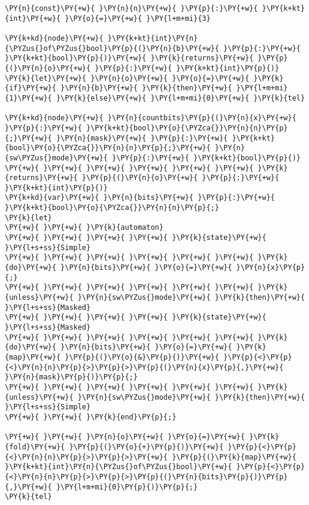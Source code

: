 \begin{Verbatim}[commandchars=\\\{\}]
\PY{n}{const}\PY{+w}{ }\PY{n}{n}\PY{+w}{ }\PY{p}{:}\PY{+w}{ }\PY{k+kt}{int}\PY{+w}{ }\PY{o}{=}\PY{+w}{ }\PY{l+m+mi}{3}

\PY{k+kd}{node}\PY{+w}{ }\PY{k+kt}{int}\PY{n}{\PYZus{}of\PYZus{}bool}\PY{p}{(}\PY{n}{b}\PY{+w}{ }\PY{p}{:}\PY{+w}{ }\PY{k+kt}{bool}\PY{p}{)}\PY{+w}{ }\PY{k}{returns}\PY{+w}{ }\PY{p}{(}\PY{n}{o}\PY{+w}{ }\PY{p}{:}\PY{+w}{ }\PY{k+kt}{int}\PY{p}{)}
\PY{k}{let}\PY{+w}{ }\PY{n}{o}\PY{+w}{ }\PY{o}{=}\PY{+w}{ }\PY{k}{if}\PY{+w}{ }\PY{n}{b}\PY{+w}{ }\PY{k}{then}\PY{+w}{ }\PY{l+m+mi}{1}\PY{+w}{ }\PY{k}{else}\PY{+w}{ }\PY{l+m+mi}{0}\PY{+w}{ }\PY{k}{tel}

\PY{k+kd}{node}\PY{+w}{ }\PY{n}{countbits}\PY{p}{(}\PY{n}{x}\PY{+w}{ }\PY{p}{:}\PY{+w}{ }\PY{k+kt}{bool}\PY{o}{\PYZca{}}\PY{n}{n}\PY{p}{;}\PY{+w}{ }\PY{n}{mask}\PY{+w}{ }\PY{p}{:}\PY{+w}{ }\PY{k+kt}{bool}\PY{o}{\PYZca{}}\PY{n}{n}\PY{p}{;}\PY{+w}{ }\PY{n}{sw\PYZus{}mode}\PY{+w}{ }\PY{p}{:}\PY{+w}{ }\PY{k+kt}{bool}\PY{p}{)}
\PY{+w}{ }\PY{+w}{ }\PY{+w}{ }\PY{+w}{ }\PY{+w}{ }\PY{+w}{ }\PY{k}{returns}\PY{+w}{ }\PY{p}{(}\PY{n}{o}\PY{+w}{ }\PY{p}{:}\PY{+w}{ }\PY{k+kt}{int}\PY{p}{)}
\PY{k+kd}{var}\PY{+w}{ }\PY{n}{bits}\PY{+w}{ }\PY{p}{:}\PY{+w}{ }\PY{k+kt}{bool}\PY{o}{\PYZca{}}\PY{n}{n}\PY{p}{;}
\PY{k}{let}
\PY{+w}{ }\PY{+w}{ }\PY{k}{automaton}
\PY{+w}{ }\PY{+w}{ }\PY{+w}{ }\PY{+w}{ }\PY{k}{state}\PY{+w}{ }\PY{l+s+ss}{Simple}
\PY{+w}{ }\PY{+w}{ }\PY{+w}{ }\PY{+w}{ }\PY{+w}{ }\PY{+w}{ }\PY{k}{do}\PY{+w}{ }\PY{n}{bits}\PY{+w}{ }\PY{o}{=}\PY{+w}{ }\PY{n}{x}\PY{p}{;}
\PY{+w}{ }\PY{+w}{ }\PY{+w}{ }\PY{+w}{ }\PY{+w}{ }\PY{+w}{ }\PY{k}{unless}\PY{+w}{ }\PY{n}{sw\PYZus{}mode}\PY{+w}{ }\PY{k}{then}\PY{+w}{ }\PY{l+s+ss}{Masked}
\PY{+w}{ }\PY{+w}{ }\PY{+w}{ }\PY{+w}{ }\PY{k}{state}\PY{+w}{ }\PY{l+s+ss}{Masked}
\PY{+w}{ }\PY{+w}{ }\PY{+w}{ }\PY{+w}{ }\PY{+w}{ }\PY{+w}{ }\PY{k}{do}\PY{+w}{ }\PY{n}{bits}\PY{+w}{ }\PY{o}{=}\PY{+w}{ }\PY{k}{map}\PY{+w}{ }\PY{p}{(}\PY{o}{&}\PY{p}{)}\PY{+w}{ }\PY{p}{<}\PY{p}{<}\PY{n}{n}\PY{p}{>}\PY{p}{>}\PY{p}{(}\PY{n}{x}\PY{p}{,}\PY{+w}{ }\PY{n}{mask}\PY{p}{)}\PY{p}{;}
\PY{+w}{ }\PY{+w}{ }\PY{+w}{ }\PY{+w}{ }\PY{+w}{ }\PY{+w}{ }\PY{k}{unless}\PY{+w}{ }\PY{n}{sw\PYZus{}mode}\PY{+w}{ }\PY{k}{then}\PY{+w}{ }\PY{l+s+ss}{Simple}
\PY{+w}{ }\PY{+w}{ }\PY{k}{end}\PY{p}{;}

\PY{+w}{ }\PY{+w}{ }\PY{n}{o}\PY{+w}{ }\PY{o}{=}\PY{+w}{ }\PY{k}{fold}\PY{+w}{ }\PY{p}{(}\PY{o}{+}\PY{p}{)}\PY{+w}{ }\PY{p}{<}\PY{p}{<}\PY{n}{n}\PY{p}{>}\PY{p}{>}\PY{+w}{ }\PY{p}{(}\PY{k}{map}\PY{+w}{ }\PY{k+kt}{int}\PY{n}{\PYZus{}of\PYZus{}bool}\PY{+w}{ }\PY{p}{<}\PY{p}{<}\PY{n}{n}\PY{p}{>}\PY{p}{>}\PY{p}{(}\PY{n}{bits}\PY{p}{)}\PY{p}{,}\PY{+w}{ }\PY{l+m+mi}{0}\PY{p}{)}\PY{p}{;}
\PY{k}{tel}


\end{Verbatim}
